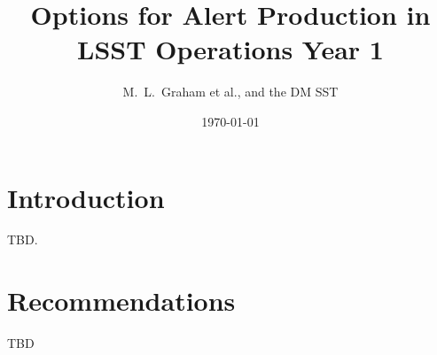 \documentclass[DM,lsstdraft,toc]{lsstdoc}
\title[Alert Production in Year 1]{Options for Alert Production in \\ LSST Operations Year 1}
\author{M.~L.~Graham et al., and the DM SST}
\date{\today}
\begin{document}
\maketitle


\section{Introduction} \label{sec:intro}

TBD.



\section{Recommendations}\label{sec:rec}
 TBD






\end{document}
